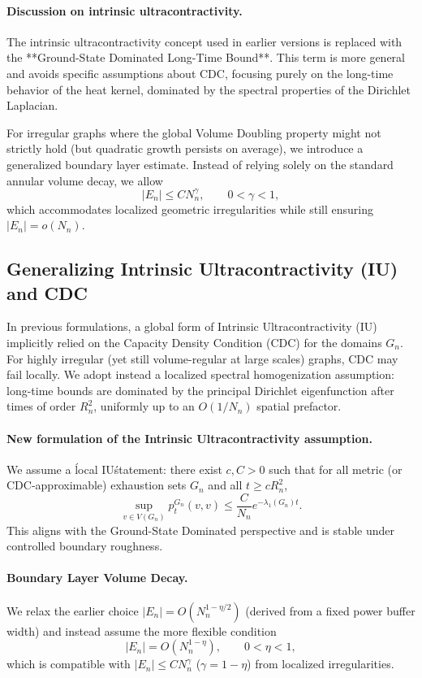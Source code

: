 \documentclass{article}
\numberwithin{equation}{section}
\theoremstyle{definition}
\theoremstyle{remark}
\begin{document}
\paragraph{Discussion on intrinsic ultracontractivity.}
The intrinsic ultracontractivity concept used in earlier versions is replaced with the **Ground-State Dominated Long-Time Bound**. This term is more general and avoids specific assumptions about CDC, focusing purely on the long-time behavior of the heat kernel, dominated by the spectral properties of the Dirichlet Laplacian.

For irregular graphs where the global Volume Doubling property might not strictly hold (but quadratic growth persists on average), we introduce a generalized boundary layer estimate. Instead of relying solely on the standard annular volume decay, we allow
\[
	|E_n| \leq C N_n^{\gamma}, \qquad 0 < \gamma < 1,
\]
which accommodates localized geometric irregularities while still ensuring $|E_n| = o(N_n)$.

\subsection{Generalizing Intrinsic Ultracontractivity (IU) and CDC}

In previous formulations, a global form of Intrinsic Ultracontractivity (IU) implicitly relied on the Capacity Density Condition (CDC) for the domains $G_n$. For highly irregular (yet still volume-regular at large scales) graphs, CDC may fail locally. We adopt instead a localized spectral homogenization assumption: long-time bounds are dominated by the principal Dirichlet eigenfunction after times of order $R_n^2$, uniformly up to an $O(1/N_n)$ spatial prefactor.

\paragraph{New formulation of the Intrinsic Ultracontractivity assumption.}
We assume a \'local IU\' statement: there exist $c, C>0$ such that for all metric (or CDC-approximable) exhaustion sets $G_n$ and all $t \ge c R_n^2$,
\[
	\sup_{v \in V(G_n)} p_t^{G_n}(v,v) \le \frac{C}{N_n} e^{-\lambda_1(G_n) t}.
\]
This aligns with the Ground-State Dominated perspective and is stable under controlled boundary roughness.

\paragraph{Boundary Layer Volume Decay.}
We relax the earlier choice $|E_n|=O(N_n^{1-\eta/2})$ (derived from a fixed power buffer width) and instead assume the more flexible condition
\[
	|E_n| = O(N_n^{1-\eta}), \qquad 0<\eta<1,
\]
which is compatible with $|E_n| \le C N_n^{\gamma}$ ($\gamma = 1-\eta$) from localized irregularities.
\end{document}
